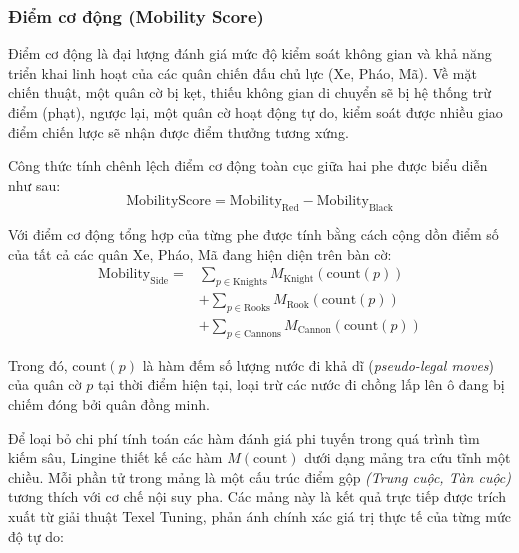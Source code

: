 \subsubsection{Điểm cơ động (Mobility Score)}

Điểm cơ động là đại lượng đánh giá mức độ kiểm soát không gian và khả năng triển khai linh hoạt của các quân chiến đấu chủ lực (Xe, Pháo, Mã). Về mặt chiến thuật, một quân cờ bị kẹt, thiếu không gian di chuyển sẽ bị hệ thống trừ điểm (phạt), ngược lại, một quân cờ hoạt động tự do, kiểm soát được nhiều giao điểm chiến lược sẽ nhận được điểm thưởng tương xứng.

Công thức tính chênh lệch điểm cơ động toàn cục giữa hai phe được biểu diễn như sau:
\begin{equation}
\text{MobilityScore} = \text{Mobility}_{\text{Red}} - \text{Mobility}_{\text{Black}}
\end{equation}

Với điểm cơ động tổng hợp của từng phe được tính bằng cách cộng dồn điểm số của tất cả các quân Xe, Pháo, Mã đang hiện diện trên bàn cờ:
\begin{align*}
  \text{Mobility}_{\text{Side}}  = & {} \sum_{p \in \text{Knights}} M_{\text{Knight}}(\text{count}(p)) \\
& + \sum_{p \in \text{Rooks}} M_{\text{Rook}}(\text{count}(p)) \\
& + \sum_{p \in \text{Cannons}} M_{\text{Cannon}}(\text{count}(p))
\end{align*}

Trong đó, $\text{count}(p)$ là hàm đếm số lượng nước đi khả dĩ (\textit{pseudo-legal moves}) của quân cờ $p$ tại thời điểm hiện tại, loại trừ các nước đi chồng lấp lên ô đang bị chiếm đóng bởi quân đồng minh.

Để loại bỏ chi phí tính toán các hàm đánh giá phi tuyến trong quá trình tìm kiếm sâu, Lingine thiết kế các hàm $M(\text{count})$ dưới dạng mảng tra cứu tĩnh một chiều. Mỗi phần tử trong mảng là một cấu trúc điểm gộp \textit{(Trung cuộc, Tàn cuộc)} tương thích với cơ chế nội suy pha. Các mảng này là kết quả trực tiếp được trích xuất từ giải thuật Texel Tuning, phản ánh chính xác giá trị thực tế của từng mức độ tự do:

